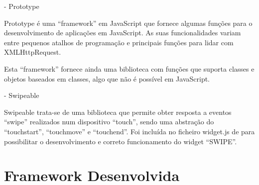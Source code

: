 - Prototype

Prototype é uma “framework” em JavaScript que fornece algumas funções para o desenvolvimento de aplicações em JavaScript. As suas funcionalidades variam entre pequenos atalhos de programação e principais funções para lidar com XMLHttpRequest.

Esta “framework” fornece ainda uma biblioteca com funções que suporta classes e objetos baseados em classes, algo que não é possível em JavaScript.

- Swipeable

Swipeable trata-se de uma biblioteca que permite obter resposta a eventos “swipe” realizados num dispositivo “touch”, sendo uma abstração do “touchstart”, “touchmove” e “touchend”. 
Foi incluída no ficheiro widget.js de para possibilitar o desenvolvimento e correto funcionamento do widget “SWIPE”.


\section{Framework Desenvolvida} \label{sec:framework}


